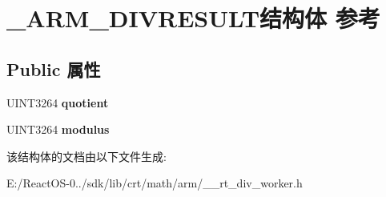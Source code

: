 \hypertarget{struct___a_r_m___d_i_v_r_e_s_u_l_t}{}\section{\+\_\+\+A\+R\+M\+\_\+\+D\+I\+V\+R\+E\+S\+U\+L\+T结构体 参考}
\label{struct___a_r_m___d_i_v_r_e_s_u_l_t}
\subsection*{Public 属性}
\begin{DoxyCompactItemize}
\item 
\mbox{\label{struct___a_r_m___d_i_v_r_e_s_u_l_t_abead4f9b2cc1c1c114d9fd4c62f5fd6f}} 
U\+I\+N\+T3264 {\bfseries quotient}
\item 
\mbox{\label{struct___a_r_m___d_i_v_r_e_s_u_l_t_a106dfacf835e21ddcb2fcc53cebb30b7}} 
U\+I\+N\+T3264 {\bfseries modulus}
\end{DoxyCompactItemize}


该结构体的文档由以下文件生成\+:\begin{DoxyCompactItemize}
\item 
E\+:/\+React\+O\+S-\/0../sdk/lib/crt/math/arm/\+\_\+\+\_\+rt\+\_\+div\+\_\+worker.\+h\end{DoxyCompactItemize}
